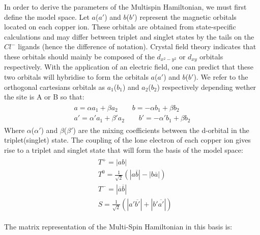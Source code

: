 \documentclass[12pt]{report}
\numberwithin{equation}{section}
\begin{document}
In order to derive the parameters of the Multispin Hamiltonian, we must first define the model space.
Let $a$($a'$) and $b$($b'$) represent the magnetic orbitals located on each copper ion. These orbitals are obtained from state-specific calculations and may differ between triplet and singlet states by the tails on the $Cl^-$ ligands (hence the difference of notation).
Crystal field theory indicates that these orbitals should mainly be composed of the $d_{x^2-y^2}$ or $d_{xy}$ orbitals respectively.
With the application of an electric field, one can predict that these two orbitals will hybridise to form the orbitals $a$($a'$) and $b$($b'$).
We refer to the orthogonal cartesians orbitals as $a_1$($b_1$) and $a_2$($b_2$) respectively depending wether the site is A or B so that:
\begin{align}
    \begin{split}
    a=\alpha a_1 + \beta a_2 \qquad b=-\alpha b_1  + \beta b_2 \\
    a'= \alpha ' a_1 +\beta ' a_2 \qquad b'=-\alpha' b_1 +\beta b_2
    \end{split}
\end{align}
Where $\alpha$($\alpha'$) and $\beta$($\beta'$) are the mixing coefficients between the d-orbital in the triplet(singlet) state.
The coupling of the lone electron of each copper ion gives rise to a triplet and singlet state that will form the basis of the model space:
\begin{align}
    \begin{split}
    &T^+=|ab|\\
    &T^0=\frac{1}{\sqrt{2}}(|a\overline{b}|-|b\overline{a}|)\\
    &T^-=|\overline{a}\overline{b}|\\
    &S=\frac{1}{\sqrt{2}}(|a'\overline{b'}|+|b'\overline{a'}|)
    \end{split}
\end{align}

The matrix representation of the Multi-Spin Hamiltonian in this basis is:
\end{document}

